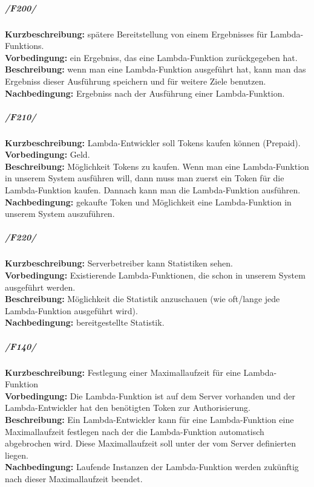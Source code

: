\documentclass[a4paper,20pt,oneside]{book}
\begin{document}
\subparagraph{/F200/}
\textbf{Kurzbeschreibung:} spätere Bereitstellung von einem Ergebnisses für \glspl{Lambda-Funktion}.
\\
\textbf{Vorbedingung:} ein Ergebniss, das eine \gls{Lambda-Funktion} zurückgegeben hat.
\\
\textbf{Beschreibung:} wenn man eine \gls{Lambda-Funktion} ausgeführt hat, kann man das Ergebniss dieser Ausführung speichern und für weitere Ziele benutzen. 
\\
\textbf{Nachbedingung:} Ergebniss nach der Ausführung einer \gls{Lambda-Funktion}.
\subparagraph{/F210/}
\textbf{Kurzbeschreibung:} \gls{Lambda-Entwickler} soll \gls{Token}s kaufen können (Prepaid).
\\
\textbf{Vorbedingung:} Geld.
\\
\textbf{Beschreibung:} Möglichkeit \gls{Token}s zu kaufen. Wenn man eine \gls{Lambda-Funktion} in unserem System ausführen will, dann muss man zuerst ein \gls{Token} für die \gls{Lambda-Funktion} kaufen. Dannach kann man die \gls{Lambda-Funktion} ausführen. 
\\
\textbf{Nachbedingung:} gekaufte \gls{Token} und Möglichkeit eine \gls{Lambda-Funktion} in unserem System auszuführen.
\subparagraph{/F220/}
\textbf{Kurzbeschreibung:} \gls{Serverbetreiber} kann Statistiken sehen.
\\
\textbf{Vorbedingung:} Existierende Lambda-Funktionen, die schon in unserem System ausgeführt werden.
\\
\textbf{Beschreibung:} Möglichkeit die Statistik anzuschauen (wie oft/lange jede \gls{Lambda-Funktion} ausgeführt wird).
\\ 
\textbf{Nachbedingung:} bereitgestellte Statistik.
\fi


\iftrue
\subparagraph{/F140/}
\textbf{Kurzbeschreibung:} Festlegung einer Maximallaufzeit für eine \Gls{Lambda-Funktion}
\\
\textbf{Vorbedingung:} Die \Gls{Lambda-Funktion} ist auf dem \Gls{Server} vorhanden und der \Gls{Lambda-Entwickler} hat den benötigten \Gls{Token} zur Authorisierung.
\\
\textbf{Beschreibung:} Ein \Gls{Lambda-Entwickler} kann für eine \Gls{Lambda-Funktion} eine Maximallaufzeit festlegen nach der die \gls{Lambda-Funktion} automatisch abgebrochen wird. Diese Maximallaufzeit soll unter der vom \Gls{Server} definierten liegen.
\\
\textbf{Nachbedingung:} Laufende Instanzen der \Gls{Lambda-Funktion} werden zukünftig nach dieser Maximallaufzeit beendet.
\end{document}
